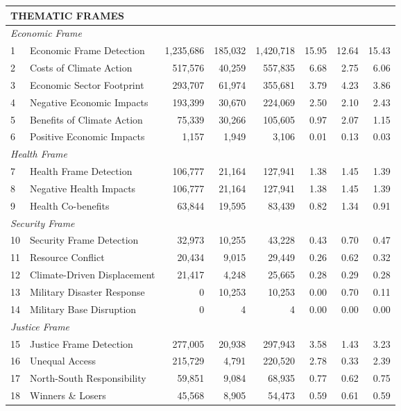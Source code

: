\documentclass[12pt]{article}
\begin{document}
{\begin{longtable}{p{0.5cm}p{5.5cm}rrrrrr}
\multicolumn{8}{l}{\cellcolor{gray!10}\textbf{THEMATIC FRAMES}} \\
\midrule
\multicolumn{8}{l}{\textit{Economic Frame}} \\
1 & Economic Frame Detection & 1,235,686 & 185,032 & 1,420,718 & 15.95 & 12.64 & 15.43 \\
2 & Costs of Climate Action & 517,576 & 40,259 & 557,835 & 6.68 & 2.75 & 6.06 \\
3 & Economic Sector Footprint & 293,707 & 61,974 & 355,681 & 3.79 & 4.23 & 3.86 \\
4 & Negative Economic Impacts & 193,399 & 30,670 & 224,069 & 2.50 & 2.10 & 2.43 \\
5 & Benefits of Climate Action & 75,339 & 30,266 & 105,605 & 0.97 & 2.07 & 1.15 \\
6 & Positive Economic Impacts & 1,157 & 1,949 & 3,106 & 0.01 & 0.13 & 0.03 \\
\midrule
\multicolumn{8}{l}{\textit{Health Frame}} \\
7 & Health Frame Detection & 106,777 & 21,164 & 127,941 & 1.38 & 1.45 & 1.39 \\
8 & Negative Health Impacts & 106,777 & 21,164 & 127,941 & 1.38 & 1.45 & 1.39 \\
9 & Health Co-benefits & 63,844 & 19,595 & 83,439 & 0.82 & 1.34 & 0.91 \\
\midrule
\multicolumn{8}{l}{\textit{Security Frame}} \\
10 & Security Frame Detection & 32,973 & 10,255 & 43,228 & 0.43 & 0.70 & 0.47 \\
11 & Resource Conflict & 20,434 & 9,015 & 29,449 & 0.26 & 0.62 & 0.32 \\
12 & Climate-Driven Displacement & 21,417 & 4,248 & 25,665 & 0.28 & 0.29 & 0.28 \\
13 & Military Disaster Response & 0 & 10,253 & 10,253 & 0.00 & 0.70 & 0.11 \\
14 & Military Base Disruption & 0 & 4 & 4 & 0.00 & 0.00 & 0.00 \\
\midrule
\multicolumn{8}{l}{\textit{Justice Frame}} \\
15 & Justice Frame Detection & 277,005 & 20,938 & 297,943 & 3.58 & 1.43 & 3.23 \\
16 & Unequal Access & 215,729 & 4,791 & 220,520 & 2.78 & 0.33 & 2.39 \\
17 & North-South Responsibility & 59,851 & 9,084 & 68,935 & 0.77 & 0.62 & 0.75 \\
18 & Winners \& Losers & 45,568 & 8,905 & 54,473 & 0.59 & 0.61 & 0.59 \\

\end{longtable}}
\end{document}
